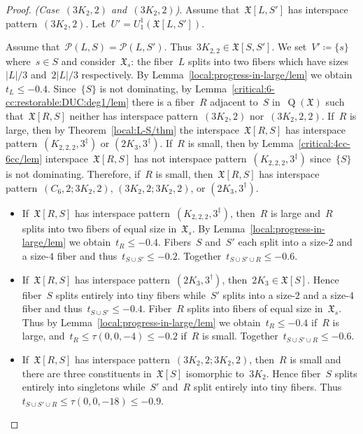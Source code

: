 \documentclass[english,a4paper]{article}
\theoremstyle{plain}
\theoremstyle{definition}
\newcommand{\coherentConfig}{\ensuremath{\mathfrak{X}}}
\newcommand{\interspace}[2]{\ensuremath{\coherentConfig[#1,#2]}}
\newcommand{\inducedCC}[1]{\ensuremath{\coherentConfig[#1]}}
\DeclareMathOperator*{\Quotient}{Q}
\newcommand{\quotientGraph}[1]{\ensuremath{\Quotient(#1)}}
\newcommand{\equivalenceClasses}[1]{\ensuremath{\mathcal{P}(#1)}}
\newcommand{\ipsixMatching}             {\ensuremath{(\disjointCliques{3}{2},2)}}
\newcommand{\ipsixMatchingTwice}        {\ensuremath{(\disjointCliques{3}{2},2,2)}}
\newcommand{\ipsixMatchingMatching}     {\ensuremath{(\disjointCliques{3}{2},2;\disjointCliques{3}{2},2)}}
\newcommand{\ipsixMatchingAndCycle}     {\ensuremath{(\cycle{6},2;\disjointCliques{3}{2},2)}}
\newcommand{\ipsixTriangle}               {\ensuremath{(\disjointCliques{2}{3},3^\dag)}}
\newcommand{\ipsixMatchingComplementD}{\ensuremath{(\clique{2,2,2},3^\ddag)}}
\newcommand{\clique}[1]{\ensuremath{K_{#1}}}
\newcommand{\cycle}[1]{\ensuremath{C_{#1}}}
\newcommand{\disjointCliques}[2]{\ensuremath{#1 \clique{#2}}}
\begin{document}
\begin{proof}
    \textit{(Case~$\ipsixMatching$ and~$\ipsixMatching$)}.
    Assume that~$\interspace{L}{S'}$ has interspace pattern~$\ipsixMatching$.
    Let~$U' = U^1_1(\interspace{L}{S'})$.

    Assume that~$\equivalenceClasses{L,S} = \equivalenceClasses{L,S'}$.
    Thus~$\disjointCliques{3}{2,2} \in \interspace{S}{S'}$.
    We set~$V' \coloneqq \{s\}$ where~$s \in S$ and consider~$\coherentConfig_s$:
    the fiber~$L$ splits into two fibers which have sizes~$|L|/3$ and~$2|L|/3$ respectively.
    By Lemma~\ref{local:progress-in-large/lem} we obtain~$t_L \leq -0.4$.
    Since~$\{S\}$ is not dominating, by Lemma~\ref{critical:6-cc:restorable:DUC:deg1/lem} there is a fiber~$R$ adjacent to~$S$ in~$\quotientGraph{\coherentConfig}$ such that~$\interspace{R}{S}$ neither has interspace pattern~$\ipsixMatching$ nor~$\ipsixMatchingTwice$.
    If~$R$ is large, then by Theorem~\ref{local:L-S/thm} the interspace~$\interspace{R}{S}$ has interspace pattern~$\ipsixMatchingComplementD$ or $\ipsixTriangle$.
    If~$R$ is small, then by Lemma~\ref{critical:4cc-6cc/lem} interspace~$\interspace{R}{S}$ has not interspace pattern~$\ipsixMatchingComplementD$ since~$\{S\}$ is not dominating.
    Therefore, if~$R$ is small, then~$\interspace{R}{S}$ has interspace pattern~$\ipsixMatchingAndCycle$, $\ipsixMatchingMatching$, or $\ipsixTriangle$.
    \begin{itemize}
        \item
        If~$\interspace{R}{S}$ has interspace pattern~$\ipsixMatchingComplementD$, then~$R$ is large and~$R$ splits into two fibers of equal size in~$\coherentConfig_s$.
        By Lemma~\ref{local:progress-in-large/lem} we obtain~$t_R \leq -0.4$.
        Fibers~$S$ and~$S'$ each split into a size-$2$ and a size-$4$ fiber and thus~$t_{S \cup S'} \leq -0.2$.
        Together~$t_{S \cup S' \cup R} \leq -0.6$.


        \item
        If~$\interspace{R}{S}$ has interspace pattern~$\ipsixTriangle$, then~$\disjointCliques{2}{3} \in \inducedCC{S}$.
        Hence fiber~$S$ splits entirely into tiny fibers while~$S'$ splits into a size-$2$ and a size-$4$ fiber and thus~$t_{S \cup S'} \leq -0.4$.
        Fiber~$R$ splits into fibers of equal size in~$\coherentConfig_s$.
        Thus by Lemma~\ref{local:progress-in-large/lem} we obtain~$t_R \leq -0.4$ if~$R$ is large, and~$t_R \leq \tau(0,0,-4) \leq -0.2$ if~$R$ is small.
        Together~$t_{S \cup S' \cup R} \leq -0.6$.


        \item
        If~$\interspace{R}{S}$ has interspace pattern~$\ipsixMatchingMatching$, then~$R$ is small and there are three constituents in~$\inducedCC{S}$ isomorphic to~$\disjointCliques{3}{2}$.
        Hence fiber~$S$ splits entirely into singletons while~$S'$ and~$R$ split entirely into tiny fibers.
        Thus~$t_{S \cup S' \cup R} \leq \tau(0,0,-18) \leq -0.9$.


\end{itemize}
\end{proof}
\end{document}
